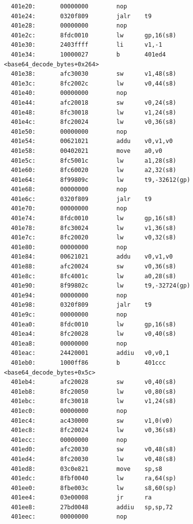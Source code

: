 \documentclass[11pt]{article}
\begin{document}
\begin{verbatim}
  401e20:       00000000        nop
  401e24:       0320f809        jalr    t9
  401e28:       00000000        nop
  401e2c:       8fdc0010        lw      gp,16(s8)
  401e30:       2403ffff        li      v1,-1
  401e34:       10000027        b       401ed4 <base64_decode_bytes+0x264>
  401e38:       afc30030        sw      v1,48(s8)
  401e3c:       8fc2002c        lw      v0,44(s8)
  401e40:       00000000        nop
  401e44:       afc20018        sw      v0,24(s8)
  401e48:       8fc30018        lw      v1,24(s8)
  401e4c:       8fc20024        lw      v0,36(s8)
  401e50:       00000000        nop
  401e54:       00621021        addu    v0,v1,v0
  401e58:       00402021        move    a0,v0
  401e5c:       8fc5001c        lw      a1,28(s8)
  401e60:       8fc60020        lw      a2,32(s8)
  401e64:       8f99809c        lw      t9,-32612(gp)
  401e68:       00000000        nop
  401e6c:       0320f809        jalr    t9
  401e70:       00000000        nop
  401e74:       8fdc0010        lw      gp,16(s8)
  401e78:       8fc30024        lw      v1,36(s8)
  401e7c:       8fc20020        lw      v0,32(s8)
  401e80:       00000000        nop
  401e84:       00621021        addu    v0,v1,v0
  401e88:       afc20024        sw      v0,36(s8)
  401e8c:       8fc4001c        lw      a0,28(s8)
  401e90:       8f99802c        lw      t9,-32724(gp)
  401e94:       00000000        nop
  401e98:       0320f809        jalr    t9
  401e9c:       00000000        nop
  401ea0:       8fdc0010        lw      gp,16(s8)
  401ea4:       8fc20028        lw      v0,40(s8)
  401ea8:       00000000        nop
  401eac:       24420001        addiu   v0,v0,1
  401eb0:       1000ff86        b       401ccc <base64_decode_bytes+0x5c>
  401eb4:       afc20028        sw      v0,40(s8)
  401eb8:       8fc20050        lw      v0,80(s8)
  401ebc:       8fc30018        lw      v1,24(s8)
  401ec0:       00000000        nop
  401ec4:       ac430000        sw      v1,0(v0)
  401ec8:       8fc20024        lw      v0,36(s8)
  401ecc:       00000000        nop
  401ed0:       afc20030        sw      v0,48(s8)
  401ed4:       8fc20030        lw      v0,48(s8)
  401ed8:       03c0e821        move    sp,s8
  401edc:       8fbf0040        lw      ra,64(sp)
  401ee0:       8fbe003c        lw      s8,60(sp)
  401ee4:       03e00008        jr      ra
  401ee8:       27bd0048        addiu   sp,sp,72
  401eec:       00000000        nop


\end{verbatim}
\end{document}
